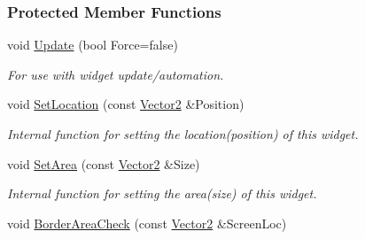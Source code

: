\subsubsection*{Protected Member Functions}
\begin{DoxyCompactItemize}
\item 
\hypertarget{classphys_1_1UI_1_1Window_a867bbe36b9eb74e9fb306303258be5a4}{
void \hyperlink{classphys_1_1UI_1_1Window_a867bbe36b9eb74e9fb306303258be5a4}{Update} (bool Force=false)}
\label{classphys_1_1UI_1_1Window_a867bbe36b9eb74e9fb306303258be5a4}

\begin{DoxyCompactList}\small\item\em For use with widget update/automation. \item\end{DoxyCompactList}\item 
\hypertarget{classphys_1_1UI_1_1Window_a72f45126d1a8282f03054470c94218bf}{
void \hyperlink{classphys_1_1UI_1_1Window_a72f45126d1a8282f03054470c94218bf}{SetLocation} (const \hyperlink{classphys_1_1Vector2}{Vector2} \&Position)}
\label{classphys_1_1UI_1_1Window_a72f45126d1a8282f03054470c94218bf}

\begin{DoxyCompactList}\small\item\em Internal function for setting the location(position) of this widget. \item\end{DoxyCompactList}\item 
\hypertarget{classphys_1_1UI_1_1Window_ab0917b15904f30d66e6ef81b840601e2}{
void \hyperlink{classphys_1_1UI_1_1Window_ab0917b15904f30d66e6ef81b840601e2}{SetArea} (const \hyperlink{classphys_1_1Vector2}{Vector2} \&Size)}
\label{classphys_1_1UI_1_1Window_ab0917b15904f30d66e6ef81b840601e2}

\begin{DoxyCompactList}\small\item\em Internal function for setting the area(size) of this widget. \item\end{DoxyCompactList}\item 
\hypertarget{classphys_1_1UI_1_1Window_ad9b1048dac8e30d5a87393e561f0ab4a}{
void \hyperlink{classphys_1_1UI_1_1Window_ad9b1048dac8e30d5a87393e561f0ab4a}{BorderAreaCheck} (const \hyperlink{classphys_1_1Vector2}{Vector2} \&ScreenLoc)}
\label{classphys_1_1UI_1_1Window_ad9b1048dac8e30d5a87393e561f0ab4a}


\end{DoxyCompactItemize}
